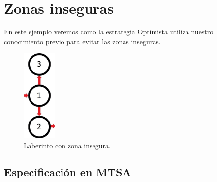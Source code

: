 \clearpage

\section{Zonas inseguras}

En este ejemplo veremos como la estrategia Optimista utiliza nuestro conocimiento previo para evitar las zonas inseguras.

\begin{figure}[H]
	\centering
		\includegraphics[width=0.15\textwidth]{Imagenes/Laberintos/unsafe.jpg}
	\caption{Laberinto con zona insegura.}
	\label{fig:unsafe}
\end{figure}

\subsection{Especificación en MTSA}

